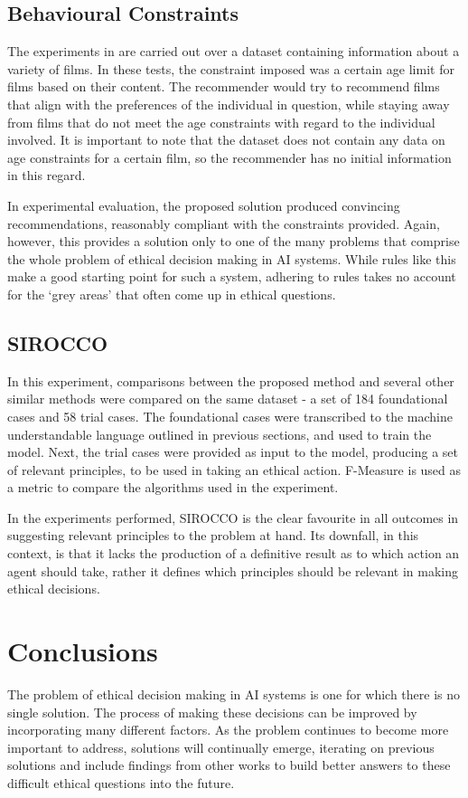\documentclass{svproc}
\begin{document}
\subsection{Behavioural Constraints}
\par
The experiments in \cite{balakrishnan} are carried out over a dataset containing information about a variety of films. In these tests, the constraint imposed was a certain age limit for films based on their content. The recommender would try to recommend films that align with the preferences of the individual in question, while staying away from films that do not meet the age constraints with regard to the individual involved. It is important to note that the dataset does not contain any data on age constraints for a certain film, so the recommender has no initial information in this regard.
\par
In experimental evaluation, the proposed solution produced convincing recommendations, reasonably compliant with the constraints provided. Again, however, this provides a solution only to one of the many problems that comprise the whole problem of ethical decision making in AI systems. While rules like this make a good starting point for such a system, adhering to rules takes no account for the `grey areas' that often come up in ethical questions.

\subsection{SIROCCO}
\par
In this experiment, comparisons between the proposed method and several other similar methods were compared on the same dataset - a set of 184 foundational cases and 58 trial cases. The foundational cases were transcribed to the machine understandable language outlined in previous sections, and used to train the model. Next, the trial cases were provided as input to the model, producing a set of relevant principles, to be used in taking an ethical action. F-Measure is used as a metric to compare the algorithms used in the experiment.
\par
In the experiments performed, SIROCCO is the clear favourite in all outcomes in suggesting relevant principles to the problem at hand. Its downfall, in this context, is that it lacks the production of a definitive result as to which action an agent should take, rather it defines which principles should be relevant in making ethical decisions.

\section{Conclusions}
The problem of ethical decision making in AI systems is one for which there is no single solution. The process of making these decisions can be improved by incorporating many different factors. As the problem continues to become more important to address, solutions will continually emerge, iterating on previous solutions and include findings from other works to build better answers to these difficult ethical questions into the future.
\end{document}
